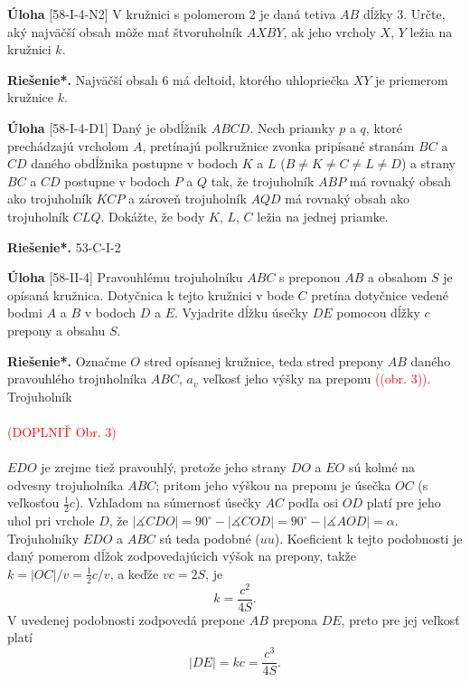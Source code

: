 \documentclass{article}
\newcommand{\rieh}{\textbf{Riešenie*.} }
\newcommand{\ma}{\measuredangle}
\newcommand\todo[1]{\noindent\textcolor{red}{(#1)}}
\newcommand{\problem}[3]{
  \begin{tcolorbox}[breakable,notitle,boxrule=0pt,colback=light-gray,colframe=light-gray]
    \textbf{Úloha}
    [#1] #2
  \end{tcolorbox}
  \noindent#3
}
\begin{document}
\problem{58-I-4-N2}{
V kružnici s polomerom 2 je daná tetiva $AB$ dĺžky 3. Určte, aký najväčší obsah môže
mať štvoruholník $AXBY$, ak jeho vrcholy $X$, $Y$ ležia na kružnici $k$.
}{
\rieh Najväčší obsah 6 má deltoid, ktorého uhlopriečka $XY$ je priemerom kružnice $k$.
}

\problem{58-I-4-D1}{
Daný je obdĺžnik $ABCD$. Nech priamky $p$ a $q$, ktoré prechádzajú vrcholom $A$, pretínajú
polkružnice zvonka pripísané stranám $BC$ a $CD$ daného obdĺžnika postupne v bodoch
$K$ a $L$ ($B\neq K \neq C \neq L \neq D$) a strany $BC$ a $CD$ postupne v bodoch $P$ a $Q$ tak, že trojuholník $ABP$ má rovnaký obsah ako trojuholník $KCP$ a zároveň trojuholník
$AQD$ má rovnaký obsah ako trojuholník $CLQ$. Dokážte, že body $K$, $L$, $C$ ležia na
jednej priamke.
}{
\rieh 53-C-I-2
}

\problem{58-II-4}{
Pravouhlému trojuholníku $ABC$ s preponou $AB$ a obsahom $S$ je opísaná kružnica. Dotyčnica k tejto kružnici v bode $C$ pretína dotyčnice vedené bodmi $A$ a $B$ v bodoch $D$ a $E$. Vyjadrite dĺžku úsečky $DE$ pomocou dĺžky $c$ prepony a obsahu $S$.
}{
\rieh Označme $O$ stred opísanej kružnice, teda stred prepony $AB$ daného pravouhlého trojuholníka $ABC$, $a_v$ veľkosť jeho výšky na preponu \todo{(obr. 3)}. Trojuholník\\
\\
\todo{DOPLNIŤ Obr. 3}\\
\\
$EDO$ je zrejme tiež pravouhlý, pretože jeho strany $DO$ a $EO$ sú kolmé na odvesny
trojuholníka $ABC$; pritom jeho výškou na preponu je úsečka $OC$ (s veľkosťou $\frac{1}{2}c$). Vzhľadom na súmernosť úsečky $AC$ podľa osi $OD$ platí pre jeho uhol pri vrchole $D$, že $|\ma CDO| = 90^\circ - |\ma COD| = 90^\circ - |\ma AOD| = \alpha$. Trojuholníky $EDO$ a $ABC$ sú teda
podobné ($uu$). Koeficient k tejto podobnosti je daný pomerom dĺžok zodpovedajúcich
výšok na prepony, takže $k = |OC|/v = \frac{1}{2}c/v$, a keďže $vc = 2S$, je
$$k =\frac{c^2}{4S}.$$
V uvedenej podobnosti zodpovedá prepone $AB$ prepona $DE$, preto pre jej veľkosť platí
$$|DE| = kc =\frac{c^3}{4S}.$$

}
\end{document}

